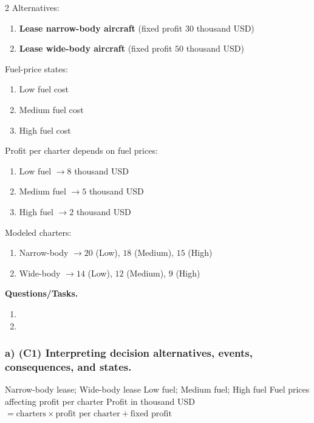 	\begin{multicols}{2}
		Alternatives:
		\begin{enumerate}[label=\arabic*.]
			\item \textbf{Lease narrow-body aircraft} (fixed profit $30$ thousand USD)
			\item \textbf{Lease wide-body aircraft} (fixed profit $50$ thousand USD)
		\end{enumerate}
	
		Fuel-price states:
		\begin{enumerate}[label=\arabic*.]
			\item Low fuel cost
			\item Medium fuel cost
			\item High fuel cost
		\end{enumerate}
	
			\columnbreak
	
		Profit per charter depends on fuel prices:
		\begin{enumerate}[label=\arabic*.]
			\item Low fuel $\to 8$ thousand USD
			\item Medium fuel $\to 5$ thousand USD
			\item High fuel $\to 2$ thousand USD
		\end{enumerate}
	
		Modeled charters:
		\begin{enumerate}[label=\arabic*.]
			\item Narrow-body $\to 20$ (Low), $18$ (Medium), $15$ (High)
			\item Wide-body $\to 14$ (Low), $12$ (Medium), $9$ (High)
		\end{enumerate}
	\end{multicols}

	\textbf{Questions/Tasks.}
	\begin{enumerate}[label=\textbf{\alph*)}]
		\item {}
		\item {}
	\end{enumerate}
	
	\subsubsection*{a) \textbf{(C1)} Interpreting decision alternatives, events, consequences, and states.}
	\label{subsec:problem13-air-cargo-charters-c1}
	\DecisionElementsTable
	{Narrow-body lease; Wide-body lease}
	{Low fuel; Medium fuel; High fuel}
	{Fuel prices affecting profit per charter}
	{Profit in thousand USD $= \text{charters} \times \text{profit per charter} + \text{fixed profit}$}
	
